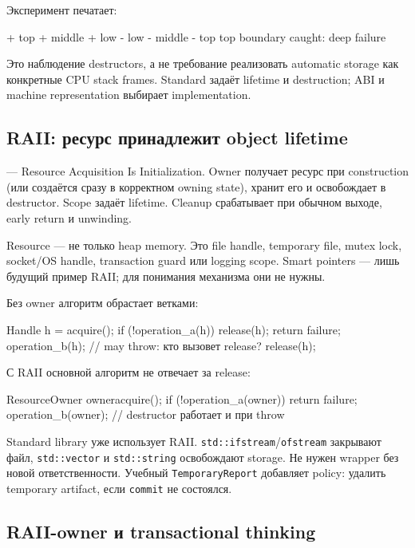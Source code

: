 Эксперимент печатает:
\begin{outputcode}
+ top
+ middle
+ low
- low
- middle
- top
top boundary caught: deep failure
\end{outputcode}

Это наблюдение destructors, а не требование реализовать automatic storage как
конкретные CPU stack frames. Standard задаёт lifetime и destruction; ABI и
machine representation выбирает implementation.

\subsection{RAII: ресурс принадлежит object lifetime}

 --- Resource Acquisition Is Initialization. Owner получает ресурс
при construction (или создаётся сразу в корректном owning state), хранит его и
освобождает в destructor. Scope задаёт lifetime. Cleanup срабатывает при обычном
выходе, early return и unwinding.

Resource --- не только heap memory. Это file handle, temporary file, mutex lock,
socket/OS handle, transaction guard или logging scope. Smart pointers --- лишь
будущий пример RAII; для понимания механизма они не нужны.

Без owner алгоритм обрастает ветками:

\begin{cppcode}
Handle h = acquire();
if (!operation_a(h)) {
    release(h);
    return failure;
}
operation_b(h);             // may throw: кто вызовет release?
release(h);
\end{cppcode}

С RAII основной алгоритм не отвечает за release:

\begin{cppcode}
ResourceOwner owner{acquire()};
if (!operation_a(owner)) return failure;
operation_b(owner);         // destructor работает и при throw
\end{cppcode}

Standard library уже использует RAII. \texttt{std::ifstream}/\texttt{ofstream}
закрывают файл, \texttt{std::vector} и \texttt{std::string} освобождают storage.
Не нужен wrapper без новой ответственности. Учебный \texttt{TemporaryReport}
добавляет policy: удалить temporary artifact, если \texttt{commit} не состоялся.

\subsection{RAII-owner и transactional thinking}

